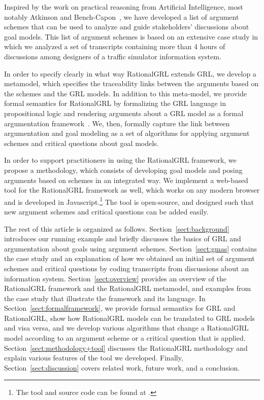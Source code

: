 Inspired by the work on practical reasoning from Artificial Intelligence, most notably Atkinson and Bench-Capon~\cite{atkinson2007}, we have developed a list of argument schemes that can be used to analyze and guide stakeholders' discussions about goal models. This list of argument schemes is based on an extensive case study in which we analyzed a set of transcripts containing more than 4 hours of discussions among designers of a traffic simulator information system. 

In order to specify clearly in what way RationalGRL extends GRL, we develop a metamodel, which specifies the traceability links between the arguments based on the schemes and the GRL models. In addition to this meta-model, we provide formal semantics for RationalGRL by formalizing the GRL language in propositional logic and rendering arguments about a GRL model as a formal argumentation framework~\cite{Dung1995}. We, then, formally capture the link between argumentation and goal modeling as a set of algorithms for applying argument schemes and critical questions about goal models. 

In order to support practitioners in using the RationalGRL framework, we propose a methodology, which consists of developing goal models and posing arguments based on schemes in an integrated way. We implement a web-based tool for the RationalGRL framework as well, which works on any modern browser and is developed in Javascript.\footnote{The tool and source code can be found at \rationalgrlurl.} The tool is open-source, and designed such that new argument schemes and critical questions can be added easily.

The rest of this article is organized as follows. Section~\ref{sect:background} introduces our running example and briefly discusses the basics of GRL and argumentation about goals using argument schemes. Section~\ref{sect:gmas} contains the case study and an explanation of how we obtained an initial set of argument schemes and critical questions by coding transcripts from discussions about an information system. Section~\ref{sect:overview} provides an overview of the RationalGRL framework and the RationalGRL metamodel, and examples from the case study that illustrate the framework and its language. In Section~\ref{sect:formalframework}, we provide formal semantics for GRL and RationalGRL, show how RationalGRL models can be translated to GRL models and visa versa, and we develop various algorithms that change a RationalGRL model according to an argument scheme or a critical question that is applied. Section~\ref{sect:methodology+tool} discusses the RationalGRL methodology and explain various features of the tool we developed. Finally, Section~\ref{sect:discussion} covers related work, future work, and a conclusion.